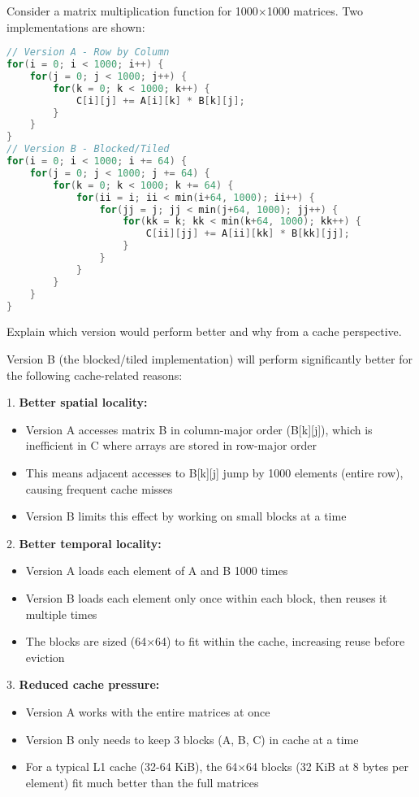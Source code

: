 \begin{example}
Consider a matrix multiplication function for 1000×1000 matrices. Two implementations are shown:

\begin{lstlisting}[language=C, style=basesmol]
// Version A - Row by Column
for(i = 0; i < 1000; i++) {
    for(j = 0; j < 1000; j++) {
        for(k = 0; k < 1000; k++) {
            C[i][j] += A[i][k] * B[k][j];
        }
    }
}
// Version B - Blocked/Tiled
for(i = 0; i < 1000; i += 64) {
    for(j = 0; j < 1000; j += 64) {
        for(k = 0; k < 1000; k += 64) {
            for(ii = i; ii < min(i+64, 1000); ii++) {
                for(jj = j; jj < min(j+64, 1000); jj++) {
                    for(kk = k; kk < min(k+64, 1000); kk++) {
                        C[ii][jj] += A[ii][kk] * B[kk][jj];
                    }
                }
            }
        }
    }
}
\end{lstlisting}

Explain which version would perform better and why from a cache perspective.

\tcblower

Version B (the blocked/tiled implementation) will perform significantly better for the following cache-related reasons:

1. \textbf{Better spatial locality:}
   \begin{itemize}
     \item Version A accesses matrix B in column-major order (B[k][j]), which is inefficient in C where arrays are stored in row-major order
     \item This means adjacent accesses to B[k][j] jump by 1000 elements (entire row), causing frequent cache misses
     \item Version B limits this effect by working on small blocks at a time
   \end{itemize}

2. \textbf{Better temporal locality:}
   \begin{itemize}
     \item Version A loads each element of A and B 1000 times
     \item Version B loads each element only once within each block, then reuses it multiple times
     \item The blocks are sized (64×64) to fit within the cache, increasing reuse before eviction
   \end{itemize}

3. \textbf{Reduced cache pressure:}
   \begin{itemize}
     \item Version A works with the entire matrices at once
     \item Version B only needs to keep 3 blocks (A, B, C) in cache at a time
     \item For a typical L1 cache (32-64 KiB), the 64×64 blocks (32 KiB at 8 bytes per element) fit much better than the full matrices
   \end{itemize}


\end{example}
